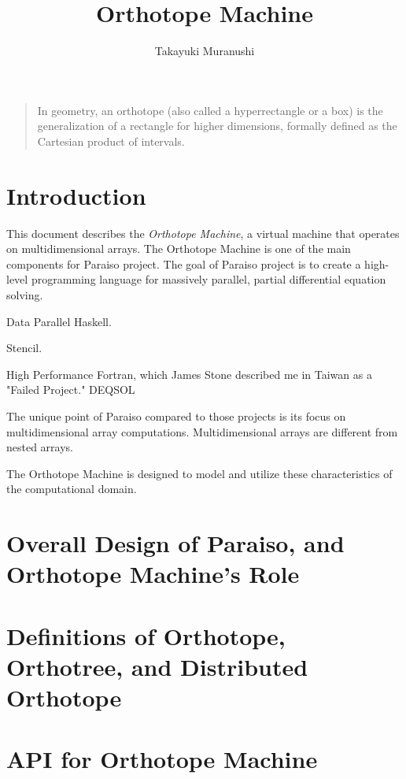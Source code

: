 \documentclass{article}
\title{Orthotope Machine}
\author{Takayuki Muranushi}
\begin{document}
\maketitle
\begin{quote}
  In geometry, an orthotope (also called a hyperrectangle or a box) is
  the generalization of a rectangle for higher dimensions, formally
  defined as the Cartesian product of intervals.
\end{quote}

\section{Introduction}

This document describes the {\em Orthotope Machine}, a virtual machine
that operates on multidimensional arrays. The Orthotope Machine is one
of the main components for Paraiso project. The goal of Paraiso
project is to create a high-level programming language for massively
parallel, partial differential equation solving.

Data Parallel Haskell\cite{nested-data-parallelism}.

Stencil.

High Performance Fortran, which James Stone described me in Taiwan as
a "Failed Project\cite{Kennedy:2007:RFH:1238844.1238851}." 
DEQSOL\cite{SAGAWANOBUTOSHI:1989-01-15,Kon'no:1986:AIS:324493.325029}

The unique point of Paraiso compared to those projects is its focus on
multidimensional array computations. Multidimensional arrays are different
from nested arrays.

The Orthotope Machine is designed to model and utilize these
characteristics of the computational domain.

\section{Overall Design of Paraiso, and Orthotope Machine's Role}


\section{Definitions of Orthotope, Orthotree, and Distributed Orthotope}

\section{API for Orthotope Machine}
\end{document}
